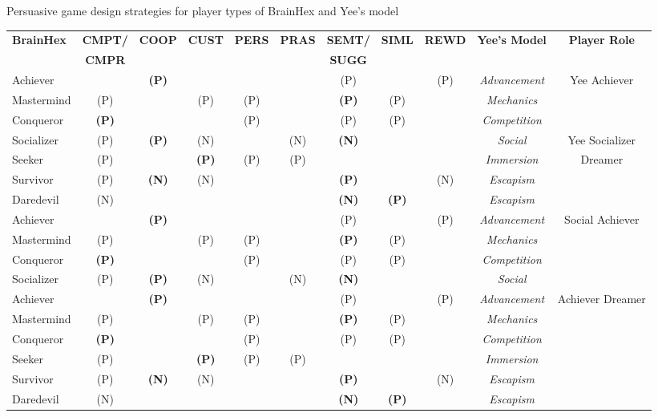 \begin{quadro}[htb]
\caption{Persuasive game design strategies for player types of BrainHex and Yee's model}
\label{tab:persuasive-strategies-model-driven-persuasive-game}
\centering
\tiny
\begin{tabular}{|l|cccccccc|c|c|}
\hline

\multirow{2}{*}{\textbf{BrainHex}}&
\multirow{1}{*}{\textbf{CMPT/}}&
\multirow{2}{*}{\textbf{COOP}}&
\multirow{2}{*}{\textbf{CUST}}&
\multirow{2}{*}{\textbf{PERS}}&
\multirow{2}{*}{\textbf{PRAS}}&
\multirow{1}{*}{\textbf{SEMT/}}&
\multirow{2}{*}{\textbf{SIML}}&
\multirow{2}{*}{\textbf{REWD}}&
\multirow{2}{*}{\textbf{Yee's Model}}&
\multirow{2}{*}{\textbf{Player Role}}\tabularnewline
&
\multirow{1}{*}{\textbf{CMPR}}&
&
&
&
&
\multirow{1}{*}{\textbf{SUGG}}&
&
&
&
\tabularnewline
\hline

Achiever& &\textbf{(P)}& & & &(P)& &(P)&\emph{Advancement}&\multirow{3}{*}{Yee Achiever}\tabularnewline
Mastermind&(P)& &(P)&(P)& &\textbf{(P)}&(P)& &\emph{Mechanics}& \tabularnewline
Conqueror&\textbf{(P)}& & &(P)& &(P)&(P)& &\emph{Competition}& \tabularnewline
\hline

Socializer&(P)&\textbf{(P)}&(N)& &(N)&\textbf{(N)}& & &\emph{Social}&Yee Socializer\tabularnewline
\hline

Seeker&(P)& &\textbf{(P)}&(P)&(P)& & & &\emph{Immersion}&\multirow{3}{*}{Dreamer}\tabularnewline
Survivor&(P)&\textbf{(N)}&(N)& & &\textbf{(P)}& &(N)&\emph{Escapism}& \tabularnewline
Daredevil&(N)& & & & &\textbf{(N)}&\textbf{(P)}& &\emph{Escapism}& \tabularnewline
\hline

Achiever& &\textbf{(P)}& & & &(P)& &(P)&\emph{Advancement}&\multirow{4}{*}{Social Achiever}\tabularnewline
Mastermind&(P)& &(P)&(P)& &\textbf{(P)}&(P)& &\emph{Mechanics}& \tabularnewline
Conqueror&\textbf{(P)}& & &(P)& &(P)&(P)& &\emph{Competition}& \tabularnewline
Socializer&(P)&\textbf{(P)}&(N)& &(N)&\textbf{(N)}& & &\emph{Social}&\tabularnewline
\hline

Achiever& &\textbf{(P)}& & & &(P)& &(P)&\emph{Advancement}&\multirow{6}{*}{Achiever Dreamer}\tabularnewline
Mastermind&(P)& &(P)&(P)& &\textbf{(P)}&(P)& &\emph{Mechanics}& \tabularnewline
Conqueror&\textbf{(P)}& & &(P)& &(P)&(P)& &\emph{Competition}& \tabularnewline
Seeker&(P)& &\textbf{(P)}&(P)&(P)& & & &\emph{Immersion}&\tabularnewline
Survivor&(P)&\textbf{(N)}&(N)& & &\textbf{(P)}& &(N)&\emph{Escapism}& \tabularnewline
Daredevil&(N)& & & & &\textbf{(N)}&\textbf{(P)}& &\emph{Escapism}& \tabularnewline
\hline


\end{tabular}
\end{quadro}
